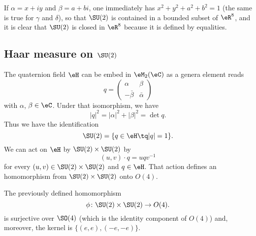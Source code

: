 If $\alpha=x+iy$ and $\beta=a+bi$, one immediately has  $x^2+y^2+a^2+b^2=1$ (the same is true for $\gamma$ and $\delta$), so that $\SU(2)$ is contained in a bounded subset of $\eR^8$, and it is clear that $\SU(2)$ is closed in $\eR^8$ because it is defined by equalities.

					\subsection{Haar measure on \texorpdfstring{$\SU(2)$}{SU2}}

The quaternion field $\eH$ can be embed in $\eM_2(\eC)$ as a genera element reads
\begin{equation}
	q=
\begin{pmatrix}
  \alpha	&	\beta	\\
  -\bar\beta	&	\bar\alpha
\end{pmatrix}
\end{equation}
with $\alpha$, $\beta\in\eC$. Under that isomorphism, we have
\[
	| q |^2=| \alpha |^2+| \beta |^2=\det q.
\]
Thus we have the identification
\begin{equation}
	\SU(2)=\{ q\in\eH\tq | q |=1 \}.
\end{equation}
We can act on $\eH$ by $\SU(2)\times \SU(2)$ by
\begin{equation}
	(u,v)\cdot q=uqv^{-1}
\end{equation}
for every $(u,v)\in \SU(2)\times\SU(2)$ and $q\in\eH$. That action defines an homomorphism from $\SU(2)\times\SU(2)$ onto $O(4)$.

\begin{proposition}
The previously defined homomorphism
\[
	\phi\colon \SU(2)\times\SU(2)\to O(4).
\]
is surjective over $\SO(4)$ (which is the identity component of $O(4)$) and, moreover, the kernel is $\big\{  (e,e),(-e,-e) \big\}$.
\end{proposition}

